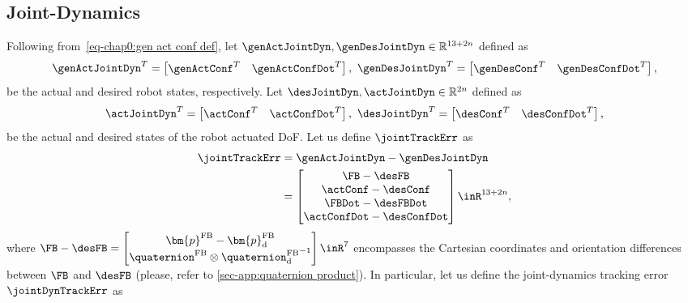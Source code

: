 \subsection{Joint-Dynamics}\label{subsec-chap3:in-out joint dynamics}
Following from~\cref{eq-chap0:gen act conf def},
let $\genActJointDyn,\genDesJointDyn\in\mathbb{R}^{13+2n}$ defined as
\begin{equation}\label{eq:gen joint dyn def}
	\genActJointDyn^T = \begin{bmatrix}
		\genActConf^T & \genActConfDot^T
	\end{bmatrix}, \	\genDesJointDyn^T = \begin{bmatrix}
		\genDesConf^T & \genDesConfDot^T
	\end{bmatrix},
\end{equation}
be the actual and desired robot states, respectively. Let $\desJointDyn,\actJointDyn\in\mathbb{R}^{2n}$ defined as
\begin{equation}\label{eq:actuated DoF states}
	\actJointDyn^T = \begin{bmatrix}
		\actConf^T & \actConfDot^T
	\end{bmatrix}, \	\desJointDyn^T = \begin{bmatrix}
		\desConf^T & \desConfDot^T
	\end{bmatrix},
\end{equation} be the actual and desired states of the robot actuated DoF. Let us define  $\jointTrackErr$ as %
\begin{align}\label{eq:joint tracking error}
\begin{split}
	\jointTrackErr &= \genActJointDyn - \genDesJointDyn \\
	&= \begin{bmatrix}
		\FB - \desFB \\
		\actConf  - \desConf \\ 
		\FBDot - \desFBDot \\
		\actConfDot - \desConfDot
	\end{bmatrix}\inR^{13+2n} ,
\end{split}	
\end{align}
where $\FB - \desFB = \begin{bmatrix}
\bm{p}^{\rm FB} - \bm{p}^{\rm FB}_{\rm d} \\ 
\quaternion^{\rm FB} \otimes{\quaternion^{\rm FB}_{\rm d}}^{-1}
\end{bmatrix}\inR^7$ encompasses the Cartesian coordinates and orientation differences between $\FB$ and $\desFB$ (please, refer to \cref{sec-app:quaternion product}). In particular, let us define the joint-dynamics tracking error $\jointDynTrackErr$ as %
